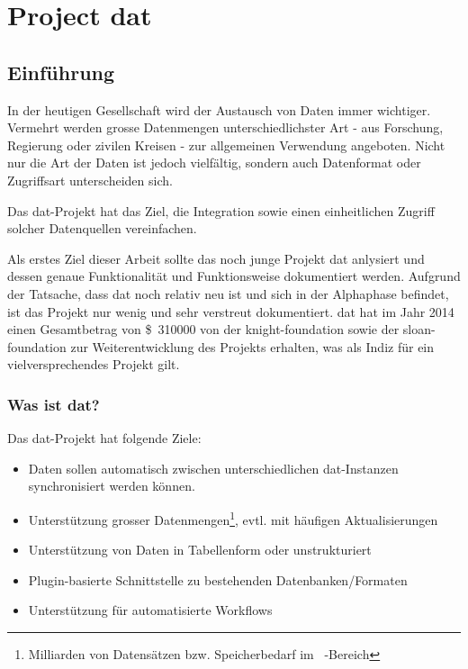 \part{Project dat}\label{part:dat}

\chapter{Einführung}

In der heutigen Gesellschaft wird der Austausch von Daten immer wichtiger. Vermehrt werden grosse Datenmengen unterschiedlichster Art - aus Forschung, Regierung oder zivilen Kreisen - zur allgemeinen Verwendung angeboten. Nicht nur die Art der Daten ist jedoch vielfältig, sondern auch Datenformat oder Zugriffsart unterscheiden sich.

Das \gls{dat}-Projekt hat das Ziel, die Integration sowie einen einheitlichen Zugriff solcher Datenquellen vereinfachen.

Als erstes Ziel dieser Arbeit sollte das noch junge Projekt \gls{dat} anlysiert und dessen genaue Funktionalität und Funktionsweise dokumentiert werden. Aufgrund der Tatsache, dass \gls{dat} noch relativ neu ist und sich in der Alphaphase befindet, ist das Projekt nur wenig und sehr verstreut dokumentiert. \Gls{dat} hat im Jahr 2014 einen Gesamtbetrag von \SI{310000}[\$]{} von der \gls{knight-foundation} sowie der \gls{sloan-foundation} zur Weiterentwicklung des Projekts erhalten, was als Indiz für ein vielversprechendes Projekt gilt.

\section{Was ist dat?} %

Das dat-Projekt hat folgende Ziele\cite{what-is-dat}: 

\begin{itemize}
\item Daten sollen automatisch zwischen unterschiedlichen dat-Instanzen synchronisiert werden können. 
\item Unterstützung grosser Datenmengen\footnote{Milliarden von Datensätzen bzw. Speicherbedarf im \si{\tera\byte}-Bereich}, evtl. mit häufigen Aktualisierungen
\item Unterstützung von Daten in Tabellenform oder unstrukturiert
\item Plugin-basierte Schnittstelle zu bestehenden Datenbanken/Formaten
\item Unterstützung für automatisierte Workflows
\end{itemize}

